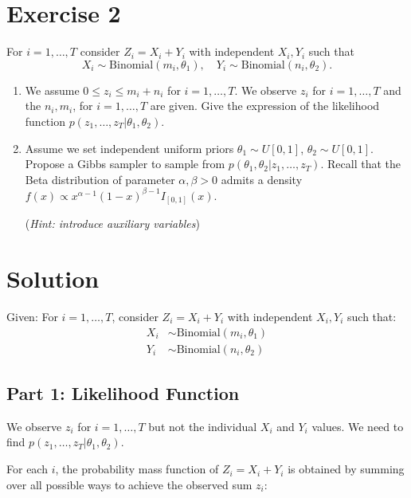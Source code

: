 \section*{Exercise 2}
For $i = 1, \ldots, T$ consider $Z_i = X_i + Y_i$ with independent $X_i, Y_i$ such that
\begin{equation}
X_i \sim \text{Binomial}(m_i, \theta_1), \quad Y_i \sim \text{Binomial}(n_i, \theta_2).
\end{equation}

\begin{enumerate}
\item We assume $0 \leq z_i \leq m_i + n_i$ for $i = 1, \ldots, T$. We observe $z_i$ for $i = 1, \ldots, T$ and the $n_i, m_i$, for $i = 1, \ldots, T$ are given. Give the expression of the likelihood function $p (z_1, \ldots, z_T | \theta_1, \theta_2)$.

\item Assume we set independent uniform priors $\theta_1 \sim U[0,1]$, $\theta_2 \sim U[0,1]$. Propose a Gibbs sampler to sample from $p (\theta_1, \theta_2| z_1, \ldots, z_T)$. Recall that the Beta distribution of parameter $\alpha, \beta > 0$ admits a density $f (x) \propto x^{\alpha-1}(1 - x)^{\beta-1}I_{[0,1]} (x)$.

(\emph{Hint: introduce auxiliary variables})
\end{enumerate}


\section*{Solution}

Given: For $i = 1, \ldots, T$, consider $Z_i = X_i + Y_i$ with independent $X_i, Y_i$ such that:
\begin{align}
X_i &\sim \text{Binomial}(m_i, \theta_1)\\
Y_i &\sim \text{Binomial}(n_i, \theta_2)
\end{align}

\subsection*{Part 1: Likelihood Function}

We observe $z_i$ for $i = 1, \ldots, T$ but not the individual $X_i$ and $Y_i$ values. We need to find $p(z_1, \ldots, z_T | \theta_1, \theta_2)$.

For each $i$, the probability mass function of $Z_i = X_i + Y_i$ is obtained by summing over all possible ways to achieve the observed sum $z_i$:

